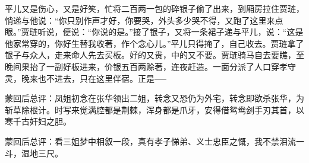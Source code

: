\begin{parag}


    平儿又是伤心，又是好笑，忙将二百两一包的碎银子偷了出来，到厢房拉住贾琏，悄递与他说：“你只别作声才好，你要哭，外头多少哭不得，又跑了这里来点眼。”贾琏听说，便说：“你说的是。”接了银子，又将一条裙子递与平儿，说：“这是他家常穿的，你好生替我收著，作个念心儿。”平儿只得掩了，自己收去。贾琏拿了银子与众人，走来命人先去买板。好的又贵，中的又不要。贾琏骑马自去要瞧，至晚间果抬了一副好板进来，价银五百两赊著，连夜赶造。一面分派了人口穿孝守灵，晚来也不进去，只在这里伴宿。正是──
\end{parag}

\begin{parag}

    \begin{note}蒙回后总评：凤姐初念在张华领出二姐，转念又恐仍为外宅，转念即欲杀张华，为斩草除根计。时写来觉满腔都是荆棘，浑身都是爪牙，安得借鸳鸯剑手刃其首，以寒千古奸妇之胆。\end{note}
\end{parag}


\begin{parag}


    \begin{note}蒙回后总评：看三姐梦中相叙一段，真有孝子悌弟、义士忠臣之慨，我不禁泪流一斗，湿地三尺。\end{note}
\end{parag}
